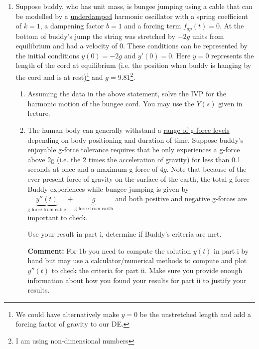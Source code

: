 \documentclass[11pt,a4paper]{article}
\begin{document}
\begin{enumerate}
\begin{enumerate}
			
			\item Suppose buddy, who has unit mass, is bungee jumping using a cable that can be modelled by a \underline{underdamped} harmonic oscillator with a spring coefficient of $k=1$, a dampening factor $b=1$ and a forcing term $f_{ap}(t)=0$. At the bottom of buddy's jump the string was stretched by $-2g$ units from equilibrium and had a velocity of $0$. These conditions can be represented by the initial conditions $y(0)=-2g$ and $y'(0)=0$. Here $y=0$ represents the length of the cord at equilibrium (i.e. the position when buddy is hanging by the cord and is at rest)\footnote{We could have alternatively make $y=0$ be the unstretched length and add a forcing factor of gravity to our DE.} and $g=9.81$\footnote{I am using non-dimensional numbers}.
			
			\begin{enumerate}
				\item Assuming the data in the above statement, solve the IVP for the harmonic motion of the bungee cord. You may use the $Y(s)$ given in lecture.
				

				
				\item The human body can generally withstand a \href{https://en.wikipedia.org/wiki/G-force#Human_tolerance}{range of g-force levels} depending on body positioning and duration of time. Suppose buddy's enjoyable g-force tolerance requires that he only experiences a g-force above 2g (i.e. the 2 times the acceleration of gravity) for less than 0.1 seconds at once and a maximum g-force of $4g$. Note that because of the ever present force of gravity on the surface of the earth, the total g-force Buddy experiences while bungee jumping is given by $\underbrace{y''(t)}_\text{g-force from cable}+\underbrace{g}_\text{g-force from earth}$ and both positive and negative g-forces are important to check. 
				
				Use your result in part i, determine if Buddy's criteria are met.
				
				\textbf{Comment:} For 1b you need to compute the solution $y(t)$ in part i by hand but may use a calculator/numerical methods to compute and plot $y''(t)$ to check the criteria for part ii. Make sure you provide enough information about how you found your results for part ii to justify your results. 
				
				
			\end{enumerate}
			
			
			

\end{enumerate}
\end{enumerate}
\end{document}
